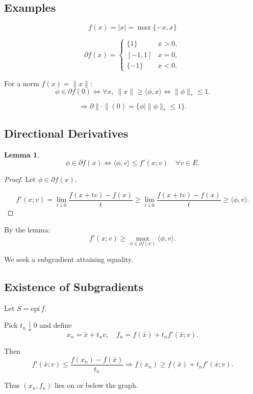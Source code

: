 \documentclass[12pt,oneside]{book}
\numberwithin{equation}{section}
\theoremstyle{definition}
\theoremstyle{plain}
\newtheorem{lemma}{Lemma}[section]
\theoremstyle{remark}
\begin{document}
\subsection*{Examples}

\[
f(x) = |x| = \max\{-x, x\}
\]

\[
\partial f(x) =
\begin{cases}
\{1\} & x > 0, \\
[-1,1] & x = 0, \\
\{-1\} & x < 0.
\end{cases}
\]

For a norm $f(x) = \|x\|$:
\[
\phi \in \partial f(0)
\iff
\forall x,\ \|x\| \ge \langle \phi, x \rangle
\iff
\|\phi\|_* \le 1.
\]

\[
\Rightarrow \partial \|\cdot\|(0) = \{\phi \mid \|\phi\|_* \le 1\}.
\]

\subsection{Directional Derivatives}

\begin{lemma}
\[
\phi \in \partial f(x)
\iff
\langle \phi, v \rangle \le f'(x;v)
\quad \forall v \in E.
\]
\end{lemma}

\begin{proof}
Let $\phi \in \partial f(x)$.

\[
f'(x;v) = \lim_{t \downarrow 0} \frac{f(x+tv) - f(x)}{t}
\ge \lim_{t \downarrow 0} \frac{f(x + t v) - f(x)}{t}
\ge \langle \phi, v \rangle.
\]
\end{proof}

By the lemma:
\[
f'(x;v) \ge \max_{\phi \in \partial f(x)} \langle \phi, v \rangle.
\]

We seek a subgradient attaining equality.

\subsection*{Existence of Subgradients}

Let $S = \mathrm{epi}\, f$.

Pick $t_n \downarrow 0$ and define
\[
x_n = \bar{x} + t_n v, \quad
f_n = f(\bar{x}) + t_n f'(\bar{x};v).
\]

Then
\[
f'( \bar{x}; v ) \le \frac{f(x_n) - f(\bar{x})}{t_n}
\Rightarrow
f(x_n) \ge f(\bar{x}) + t_n f'(\bar{x};v).
\]

Thus $(x_n,f_n)$ lies on or below the graph.
\end{document}
